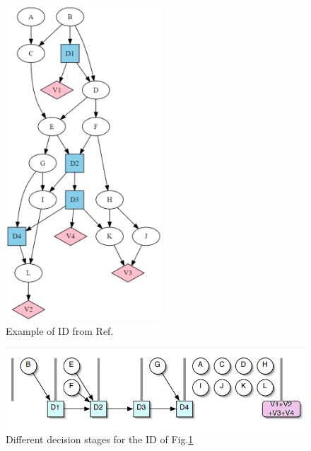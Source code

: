 \begin{itemize}
\begin{figure}[h!]
\centering
\includegraphics[width=2.3in]{influ-diag/sha-fig1.png}
\caption{Example of ID from Ref.\cite{sha-influ-diag}}
\label{fig-sha-fig1}
\end{figure}


\begin{figure}[h!]
\centering
\includegraphics[width=6in]
{influ-diag/influ-diag-stages.jpg}
\caption{Different decision stages for the ID of Fig.\ref{fig-sha-fig1}}
\label{fig-jensen-stages}
\end{figure}


\end{itemize}
